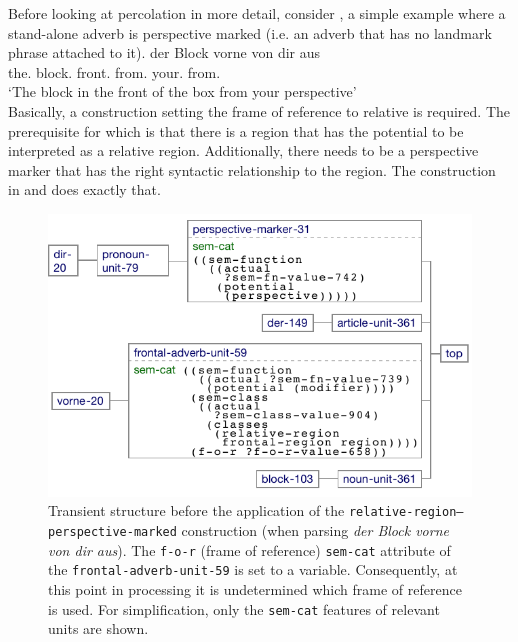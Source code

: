 Before looking at percolation in more detail, consider , a simple example where a 
stand-alone adverb is perspective marked (i.e. an adverb that has no landmark 
phrase attached to it).
\ea
\label{e:der-block-vorne-von-dir-aus}
\gll der Block vorne von dir aus\\
the.{\NOM} block.{\NOM} front.{\ADV}  from.{\PREP} your.{\DAT} from.{\PREP}\\ 
\glt `The block in the front of the box from your perspective'\\
\z{}
Basically, a construction setting the frame of reference to relative is required.
The prerequisite for which is that there is a region that has the potential to be
interpreted as a relative region. Additionally, there needs to be a perspective 
marker that has the right syntactic relationship to the region.
The construction in  and  does exactly that.

\begin{figure}
\begin{center}
\includegraphics[width=0.8\columnwidth]{figs/perspective-marking-parsing-vorn-von-dir-aus-before} 
\caption[Transient structure before application]{%
Transient structure before the application of 
the {\footnotesize\tt relative-region--perspective-marked} construction
(when parsing \textit{der Block vorne von dir aus}). The {\footnotesize\tt f-o-r} 
(frame of reference) {\footnotesize\tt sem-cat} attribute of the 
{\footnotesize\tt frontal-adverb-unit-59} is set to a variable. Consequently, 
at this point in processing it is undetermined which
frame of reference is used. For simplification, 
only the {\footnotesize\tt sem-cat} features of relevant units 
are shown.}
\label{f:setting-f-o-r-before}
\end{center}
\end{figure}

